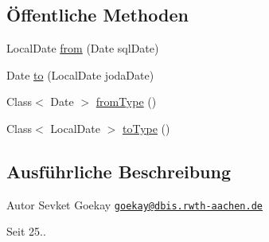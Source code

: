 \subsection*{Öffentliche Methoden}
\begin{DoxyCompactItemize}
\item 
Local\-Date \hyperlink{classde_1_1rwth_1_1idsg_1_1steve_1_1utils_1_1_date_converter_aaa5fde5d6587bc577e4dc66adb593d85}{from} (Date sql\-Date)
\item 
Date \hyperlink{classde_1_1rwth_1_1idsg_1_1steve_1_1utils_1_1_date_converter_abc397ad1d1a5de126d282c2fd716a090}{to} (Local\-Date joda\-Date)
\item 
Class$<$ Date $>$ \hyperlink{classde_1_1rwth_1_1idsg_1_1steve_1_1utils_1_1_date_converter_ab0f8d5d4d13d57ab986c4432d4a9e4e3}{from\-Type} ()
\item 
Class$<$ Local\-Date $>$ \hyperlink{classde_1_1rwth_1_1idsg_1_1steve_1_1utils_1_1_date_converter_a59d67af6551b4f352f9f4b4e30bc1527}{to\-Type} ()
\end{DoxyCompactItemize}


\subsection{Ausführliche Beschreibung}
\begin{DoxyAuthor}{Autor}
Sevket Goekay \href{mailto:goekay@dbis.rwth-aachen.de}{\tt goekay@dbis.\-rwth-\/aachen.\-de} 
\end{DoxyAuthor}
\begin{DoxySince}{Seit}
25.. 
\end{DoxySince}


